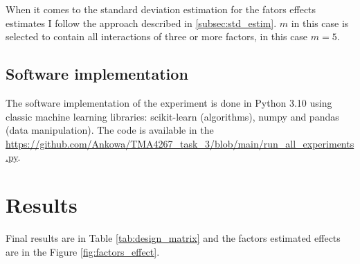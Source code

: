 \documentclass{article}
\begin{document}
When it comes to the standard deviation estimation for the fators effects estimates I follow the approach described in \ref{subsec:std_estim}. $m$ in this case is selected to contain all interactions of three or more factors, in this case $m=5$.

\subsection{Software implementation}

The software implementation of the experiment is done in Python 3.10 using classic machine learning libraries: scikit-learn (algorithms), numpy and pandas (data manipulation). The code is available in the \url{https://github.com/Ankowa/TMA4267_task_3/blob/main/run_all_experiments.py}.

\section{Results}

Final results are in Table \ref{tab:design_matrix} and the factors estimated effects are in the Figure \ref{fig:factors_effect}.
\end{document}
